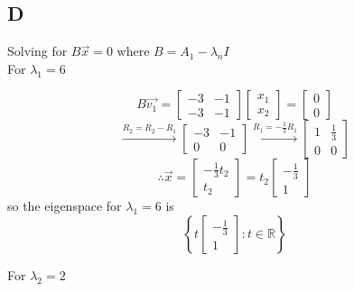 \documentclass{article}
\begin{document}
\subsection*{D}

Solving for \(B\vec{x}=0\) where \(B = A_1 - \lambda_n I\)\\

For \(\lambda_1 = 6\)

\[
	B \vec{v_1} =
	\begin{bmatrix}
		-3 & -1 \\
		-3 & -1
	\end{bmatrix}
	\begin{bmatrix}
		x_1 \\
		x_2
	\end{bmatrix}
	=
	\begin{bmatrix}
		0 \\0
	\end{bmatrix}
\]
\[
	\xrightarrow{R_2 = R_2 - R_1}
	\begin{bmatrix}
		-3 & -1 \\
		0  & 0
	\end{bmatrix}
	\xrightarrow{R_1 = -\frac{1}{3}R_1}
	\begin{bmatrix}
		1 & \frac{1}{3} \\
		0 & 0
	\end{bmatrix}
\]
\[
	\therefore \vec{x} = \begin{bmatrix}
		-\frac{1}{3} t_2 \\
		t_2
	\end{bmatrix}
	= t_2 \begin{bmatrix}
		-\frac{1}{3} \\
		1
	\end{bmatrix}
\]
so the eigenspace for \(\lambda_1 = 6\) is
\[
	\left\{ t \begin{bmatrix}
		-\frac{1}{3} \\
		1
	\end{bmatrix} : t \in \mathbb{R} \right\}
\]


For \(\lambda_2 = 2\)
\end{document}

